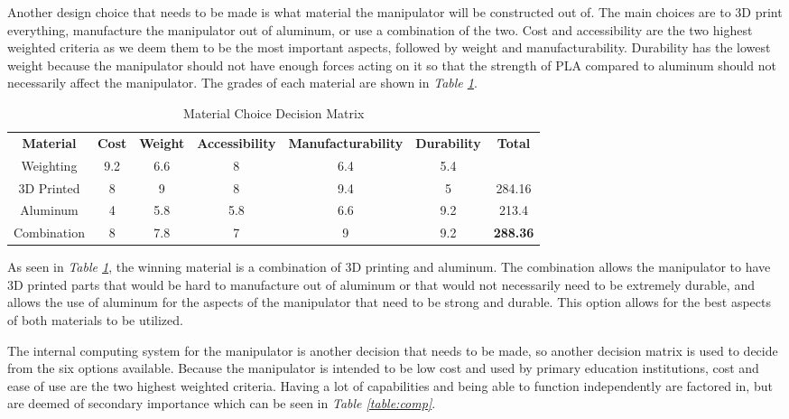 Another design choice that needs to be made is what material the manipulator will be constructed out of. The main choices are to 3D print everything, manufacture the manipulator out of aluminum, or use a combination of the two. Cost and accessibility are the two highest weighted criteria as we deem them to be the most important aspects, followed by weight and manufacturability. Durability has the lowest weight because the manipulator should not have enough forces acting on it so that the strength of PLA compared to aluminum should not necessarily affect the manipulator. The grades of each material are shown in \emph{Table \ref{table:mat}}.

\begin{table}[htp]
  \center
  \caption{Material Choice Decision Matrix}
  \label{table:mat}
\small\begin{tabular}{c|cccccc}
\textbf{Material} & \textbf{Cost} & \textbf{Weight} & \textbf{Accessibility} & \textbf{Manufacturability} & \textbf{Durability} & \textbf{Total} \\\normalsize
Weighting & 9.2 & 6.6 & 8 & 6.4 & 5.4 & \\\hline
3D Printed & 8 & 9 & 8 & 9.4 & 5 & 284.16 \\
Aluminum & 4 & 5.8 & 5.8 & 6.6 & 9.2 & 213.4 \\
Combination & 8 & 7.8 & 7 & 9 & 9.2 & \textbf{288.36} \\
\end{tabular}
\end{table}

As seen in \emph{Table \ref{table:mat}}, the winning material is a combination of 3D printing and aluminum. The combination allows the manipulator to have 3D printed parts that would be hard to manufacture out of aluminum or that would not necessarily need to be extremely durable, and allows the use of aluminum for the aspects of the manipulator that need to be strong and durable. This option allows for the best aspects of both materials to be utilized.

The internal computing system for the manipulator is another decision that needs to be made, so another decision matrix is used to decide from the six options available. Because the manipulator is intended to be low cost and used by primary education institutions, cost and ease of use are the two highest weighted criteria. Having a lot of capabilities and being able to function independently are factored in, but are deemed of secondary importance which can be seen in \emph{Table \ref{table:comp}}.

